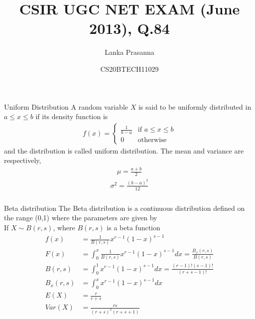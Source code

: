 \documentclass{beamer}
\title{CSIR UGC NET EXAM (June 2013), Q.84}
\author{Lanka Prasanna}
\date{CS20BTECH11029}
\begin{document}
\begin{frame}
\titlepage
\end{frame}

\begin{frame}
\frametitle{}
\begin{block}{Uniform Distribution}
A random variable $X$ is said to be uniformly distributed in $a\leq x\leq b$ if its density function is
\begin{align}
    f(x)=
    \begin{cases}
    \frac{1}{b-a} & \text{if } a\leq x \leq b\\
    0 & \text{otherwise}
    \end{cases}\label{eq:1}
\end{align}
and the distribution is called uniform distribution.
The mean and variance are respectively,
\begin{align}
    \mu=\frac{a+b}{2}\label{eq:2}
\end{align}
\begin{align}
     \sigma^2=\frac{(b-a)^2}{12}\label{eq:3}
\end{align}
\label{theorem}

\end{block}
\end{frame}

\begin{frame}
\frametitle{}
\begin{block}{Beta distribution}
The Beta distribution is a continuous distribution defined on the range
(0,1) where the parameters are given by\\
If $X\sim B(r,s)$, where $B(r,s)$ is a beta function
\begin{align}
  \label{eq:4}  f(x)&=\frac{1}{B(r,s)}x^{r-1}(1-x)^{s-1}\\ 
    \label{eq:5}F(x)&=\int_{0}^{x}\frac{1}{B(r,s)}x^{r-1}(1-x)^{s-1}dx=\frac{B_x(r,s)}{B(r,s)}\\ 
  \label{eq:6}  B(r,s)&=\int_{0}^{1}x^{r-1}(1-x)^{s-1}dx=\frac{(r-1)!(s-1)!}{(r+s-1)!}\\ 
     \label{eq:7}B_x(r,s)&=\int_{0}^{x}x^{r-1}(1-x)^{s-1}dx\\
   \label{eq:8} E(X)&=\frac{r}{r+s}\\ 
    \label{var} Var(X)&=\frac{rs}{(r+s)^{2}(r+s+1)} 
\end{align}
\end{block}
\end{frame}
\end{document}
